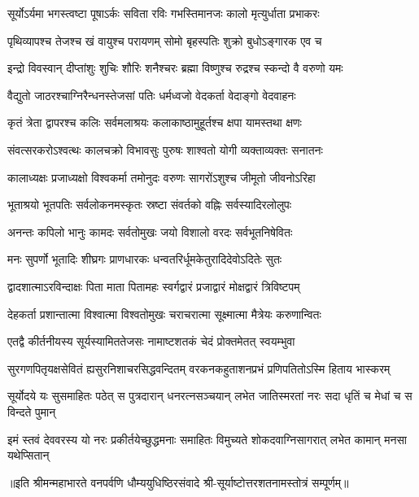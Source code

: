 


\twolineshloka
{सूर्योऽर्यमा भगस्त्वष्टा पूषाऽर्कः सविता रविः}
{गभस्तिमानजः कालो मृत्युर्धाता प्रभाकरः}

\twolineshloka
{पृथिव्यापश्च तेजश्च खं वायुश्च परायणम्}
{सोमो बृहस्पतिः शुक्रो बुधोऽङ्गारक एव च}

\twolineshloka
{इन्द्रो विवस्वान् दीप्तांशुः शुचिः शौरिः शनैश्चरः}
{ब्रह्मा विष्णुश्च रुद्रश्च स्कन्दो वै वरुणो यमः}

\twolineshloka
{वैद्युतो जाठरश्चाग्निरैन्धनस्तेजसां पतिः}
{धर्मध्वजो वेदकर्ता वेदाङ्गो वेदवाहनः}

\twolineshloka
{कृतं त्रेता द्वापरश्च कलिः सर्वमलाश्रयः}
{कलाकाष्ठामुहूर्तश्च क्षपा यामस्तथा क्षणः}

\twolineshloka
{संवत्सरकरोऽश्वत्थः कालचक्रो विभावसुः}
{पुरुषः शाश्वतो योगी व्यक्ताव्यक्तः सनातनः}

\twolineshloka
{कालाध्यक्षः प्रजाध्यक्षो विश्वकर्मा तमोनुदः}
{वरुणः सागरोंऽशुश्च जीमूतो जीवनोऽरिहा}

\twolineshloka
{भूताश्रयो भूतपतिः सर्वलोकनमस्कृतः}
{स्रष्टा संवर्तको वह्निः सर्वस्यादिरलोलुपः}

\twolineshloka
{अनन्तः कपिलो भानुः कामदः सर्वतोमुखः}
{जयो विशालो वरदः सर्वभूतनिषेवितः}

\twolineshloka
{मनः सुपर्णो भूतादिः शीघ्रगः प्राणधारकः}
{धन्वतरिर्धूमकेतुरादिदेवोऽदितेः सुतः}

\twolineshloka
{द्वादशात्माऽरविन्दाक्षः पिता माता पितामहः}
{स्वर्गद्वारं प्रजाद्वारं मोक्षद्वारं त्रिविष्टपम्}

\twolineshloka
{देहकर्ता प्रशान्तात्मा विश्वात्मा विश्वतोमुखः}
{चराचरात्मा सूक्ष्मात्मा मैत्रेयः करुणान्वितः}

\twolineshloka
{एतद्वै कीर्तनीयस्य सूर्यस्यामिततेजसः}
{नामाष्टशतकं चेदं प्रोक्तमेतत् स्वयम्भुवा}

\twolineshloka
{सुरगणपितृयक्षसेवितं ह्यसुरनिशाचरसिद्धवन्दितम्}
{वरकनकहुताशनप्रभं प्रणिपतितोऽस्मि हिताय भास्करम्}

\fourlineindentedshloka
{सूर्योदये यः सुसमाहितः पठेत्}
{स पुत्रदारान् धनरत्नसञ्चयान्}
{लभेत जातिस्मरतां नरः सदा}
{धृतिं च मेधां च स विन्दते पुमान्}

\fourlineindentedshloka
{इमं स्तवं देववरस्य यो नरः}
{प्रकीर्तयेच्छुद्धमनाः समाहितः}
{विमुच्यते शोकदवाग्निसागरात्}
{लभेत कामान् मनसा यथेप्सितान्}

॥इति श्रीमन्महाभारते वनपर्वणि धौम्ययुधिष्ठिरसंवादे श्री-सूर्याष्टोत्तरशतनामस्तोत्रं सम्पूर्णम्॥
